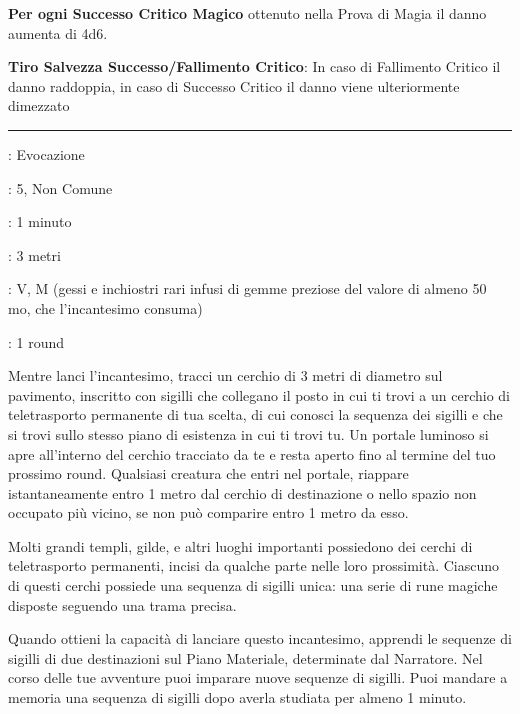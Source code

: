 \begin{multicols}{2}
\textbf{Per ogni Successo Critico Magico} ottenuto nella Prova di Magia il danno aumenta di 4d6.

\textbf{Tiro Salvezza Successo/Fallimento Critico}: In caso di Fallimento Critico il danno raddoppia, in caso di Successo Critico il danno viene ulteriormente dimezzato

\smallskip\noindent\rule{\linewidth}{2pt} \hypertarget{Cerchio di Teletrasporto}{}\smallskip{}
\noindent
\begin{description}[noitemsep, topsep=0pt, parsep=0pt, partopsep=0pt, leftmargin=0cm, labelwidth=2.8cm]
	\item[\textbf{Lista di Magia}]: Evocazione
	\item[\textbf{Livello}]: 5, Non Comune
	\item[\textbf{T. di Lancio}]: 1 minuto
	\item[\textbf{Gittata}]: 3 metri
	\item[\textbf{Componenti}]: V, M (gessi e inchiostri rari infusi di gemme preziose del valore di almeno 50 mo, che l'incantesimo consuma)
	\item[\textbf{Durata}]: 1 round
\end{description}

Mentre lanci l'incantesimo, tracci un cerchio di 3 metri di diametro sul pavimento, inscritto con sigilli che collegano il posto in cui ti trovi a un cerchio di teletrasporto permanente di tua scelta, di cui conosci la sequenza dei sigilli e che si trovi sullo stesso piano di esistenza in cui ti trovi tu. Un portale luminoso si apre all'interno del cerchio tracciato da te e resta aperto fino al termine del tuo prossimo round. Qualsiasi creatura che entri nel portale, riappare istantaneamente entro 1 metro dal cerchio di destinazione o nello spazio non occupato più vicino, se non può comparire entro 1 metro da esso.

Molti grandi templi, gilde, e altri luoghi importanti possiedono dei cerchi di teletrasporto permanenti, incisi da qualche parte nelle loro prossimità. Ciascuno di questi cerchi possiede una sequenza di sigilli unica: una serie di rune magiche disposte seguendo una trama precisa.

Quando ottieni la capacità di lanciare questo incantesimo, apprendi le sequenze di sigilli di due destinazioni sul Piano Materiale, determinate dal Narratore. Nel corso delle tue avventure puoi imparare nuove sequenze di sigilli. Puoi mandare a memoria una sequenza di sigilli dopo averla studiata per almeno 1 minuto.


\end{multicols}
